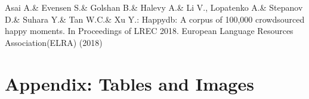 \documentclass[runningheads]{llncs}
\begin{document}
%
%
%
% 
% 
%
\begin{thebibliography}{8}

Asai A.\& Evensen S.\& Golshan B.\& Halevy A.\& Li V., Lopatenko A.\& Stepanov D.\& Suhara Y.\& Tan W.C.\& Xu Y.: Happydb: A corpus of 100,000 crowdsourced happy moments. In Proceedings of LREC 2018. European Language Resources Association(ELRA) (2018)


               




\end{thebibliography}



\appendix
\section{Appendix: Tables and Images}
\end{document}
